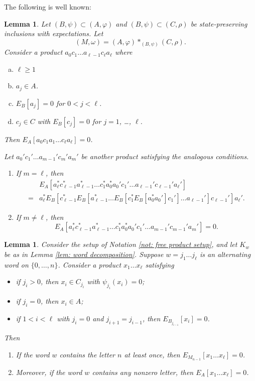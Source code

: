 \documentclass[10pt]{amsart}
\numberwithin{equation}{section}
\newtheorem{lem}[thm]{Lemma}
\theoremstyle{definition}
\begin{document}
The following is well known:
\begin{lem} \label{lem: amalgamated free product decomposition}
	Let $(B,\psi) \subset (A,\varphi)$ and $(B,\psi) \subset (C,\rho)$ be state-preserving inclusions with expectations.  Let
	\[
	(M,\omega) = (A,\varphi) *_{(B,\psi)} (C,\rho).
	\]
	Consider a product $a_0 c_1 \dots a_{\ell-1} c_\ell a_\ell$ where
	\begin{enumerate}[(a)]
		\item $\ell \geq 1$
		\item $a_j \in A$.
		\item $E_B[a_j] = 0$ for $0 < j < \ell$.
		\item $c_j \in C$ with $E_B[c_j] = 0$ for $j = 1$, \dots, $\ell$.
	\end{enumerate}
	Then $E_A[a_0 c_1 a_1 \dots c_\ell a_\ell] = 0$.
	
	Let $a_0' c_1' \dots a_{m-1}' c_m' a_m'$ be another product satisfying the analogous conditions.
	\begin{enumerate}[(1)]
		\item If $m = \ell$, then
		\begin{align*}
			&E_A[a_\ell^* c_{\ell-1}^* a_{\ell-1}^* \dots c_1^* a_0^* a_0' c_1' \dots a_{\ell-1}'c_{\ell-1}' a_\ell']\\
			= &a_\ell^* E_B[c_{\ell-1}^*E_B[a_{\ell-1}^* \dots E_B[c_1^* E_B[a_0^* a_0'] c_1'] \dots a_{\ell-1}'] c_{\ell-1}'] a_\ell'.
		\end{align*}
		\item If $m \neq \ell$, then
		\[
		E_A[a_\ell^* c_{\ell-1}^* a_{\ell-1}^* \dots c_1^* a_0^* a_0' c_1' \dots a_{m-1}'c_{m-1}' a_m'] = 0.
		\]
	\end{enumerate}
\end{lem}	

\begin{lem} \label{lem: word decomposition 2}
	Consider the setup of Notation \ref{not: free product setup}, and let $K_w$ be as in Lemma \ref{lem: word decomposition}.  Suppose $w = j_1 \dots j_\ell$ is an alternating word on $\{0,\dots,n\}$.  Consider a product $x_1 \dots x_\ell$ satisfying
	\begin{itemize}
		\item[\emph{(a)}] if $j_i > 0$, then $x_i \in C_{j_i}$ with $\psi_{j_i}(x_i) = 0$;
		\item[\emph{(b)}] if $j_i = 0$, then $x_i \in A$;
		\item[\emph{(c')}] if $1 < i < \ell$ with $j_i = 0$ and $j_{i+1} = j_{i-1}$, then $E_{B_{j_{i-1}}}[x_i] = 0$.
	\end{itemize}
	Then
	\begin{enumerate}[(1)]
		\item If the word $w$ contains the letter $n$ at least once, then $E_{M_{n-1}}[x_1 \dots x_\ell] = 0$.
		\item Moreover, if the word $w$ contains any nonzero letter, then $E_A[x_1 \dots x_\ell] = 0$.
	\end{enumerate}
\end{lem}
\end{document}

